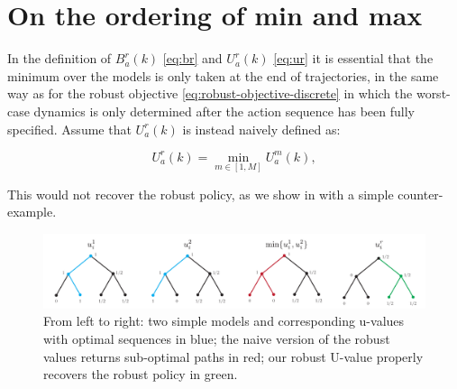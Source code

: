 \documentclass{article}
\begin{document}
\section{On the ordering of min and max}
	\label{sec:min-max-order}

	In the definition of $B_{a}^{r}(k)$ \eqref{eq:br} and $U_{a}^{r}(k)$ \eqref{eq:ur} it is essential that the minimum over the models is only taken at the end of trajectories, in the same way as for the robust objective \eqref{eq:robust-objective-discrete} in which the worst-case dynamics is only determined after the action sequence has been fully specified. Assume that $U_{a}^{r}(k)$ is instead naively defined as:
	
	\[
	U_{a}^{r}(k)=\min_{m\in[1,M]}U_{a}^{m}(k),
	\]
	
	This would not recover the robust policy, as we show in  with a simple counter-example.
	\begin{figure}[htp]
		\centering
		\includegraphics[width=\linewidth]{img/min-max-order}
		\caption{From left to right: two simple models and corresponding u-values with optimal sequences in blue; the naive version of the robust values returns sub-optimal paths in red; our robust U-value properly recovers the robust policy in green.}
		\label{fig:min-max-order}
	\end{figure}
\end{document}
